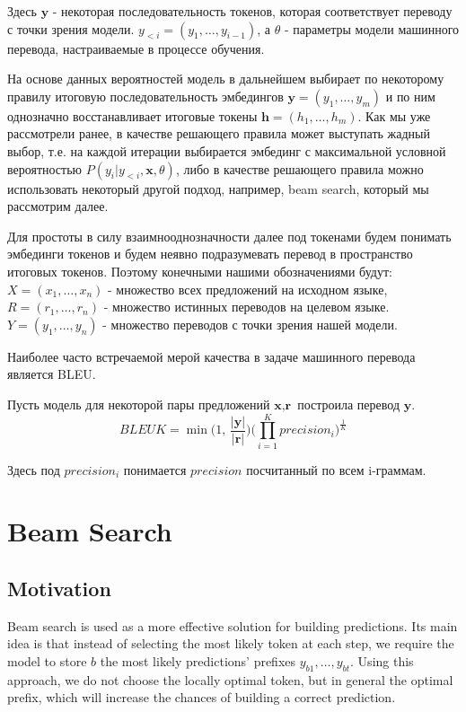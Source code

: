\documentclass[a4paper,14pt]{extarticle}
\begin{document}
	Здесь $\textbf{y}$ - некоторая последовательность токенов, которая соответствует переводу с точки зрения модели. $y_{<i}=(y_1, \dots, y_{i - 1})$, а $\theta$ - параметры модели машинного перевода, настраиваемые в процессе обучения.
	
	На основе данных вероятностей модель в дальнейшем выбирает по некоторому правилу итоговую последовательность эмбедингов  $\textbf{y} = (y_1, \dots, y_m)$ и по ним однозначно восстанавливает итоговые токены $\textbf{h} = (h_1, \dots, h_m)$. Как мы уже рассмотрели ранее, в качестве решающего правила может выступать жадный выбор, т.е. на каждой итерации выбирается эмбединг с максимальной условной вероятностью $P(y_i | y_{<i}, \textbf{x}, \theta)$, либо в качестве решающего правила можно использовать некоторый другой подход, например, beam search, который мы рассмотрим далее.
	
	Для простоты в силу взаимнооднозначности далее под токенами будем понимать эмбединги токенов и будем неявно подразумевать перевод в пространство итоговых токенов. Поэтому конечными нашими обозначениями будут: $X = (x_1, \dots, x_n)$ - множество всех предложений на исходном языке, $R = (r_1, \dots, r_n)$ - множество истинных переводов на целевом языке. $Y = (y_1, \dots, y_n)$ - множество переводов с точки зрения нашей модели.
	
	Наиболее часто встречаемой мерой качества в задаче машинного перевода является BLEU. 
	
	Пусть модель для некоторой пары предложений $\textbf{x}, \textbf{r}$ построила перевод $\textbf{y}$.
	\begin{equation}
		BLEUK = \min\Big(1, \, \frac{|\textbf{y}|}{|\textbf{r}|}\Big) \big(\prod_{i=1}^{K} precision_i\big)^{\frac1K}
	\end{equation}
	
	Здесь под $precision_i$ понимается $precision$ посчитанный по всем i-граммам.
	\section{Beam Search}
	\subsection{Motivation}
	Beam search is used as a more effective solution for building predictions. Its main idea is that instead of selecting the most likely token at each step, we require the model to store $b$ the most likely predictions' prefixes $y_{b1}, \dots, y_{bt}$. Using this approach, we do not choose the locally optimal token, but in general the optimal prefix, which will increase the chances of building a correct prediction.
\end{document}
